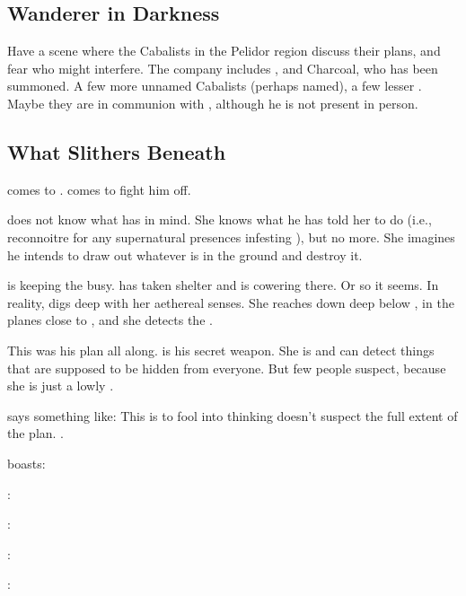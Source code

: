 \subsection{Wanderer in Darkness}
Have a scene where the Cabalists in the Pelidor region discuss their plans, and fear who might interfere. The company includes \Teshrial, \Achsah{} and Charcoal, who has been summoned. A few more unnamed Cabalists (perhaps named), a few lesser \banes{}. Maybe they are in communion with \Azraid{}, although he is not present in person. 



 






\subsection{What Slithers Beneath}
\Ishnaruchaefir comes to \Malcur. 
\Teshrial comes to fight him off. 

\Criseis does not know what \Ishnaruchaefir has in mind. 
She knows what he has told her to do (i.e., reconnoitre for any supernatural presences infesting \Malcur), but no more.
She imagines he intends to draw out whatever is in the ground and destroy it.

\Ishnaruchaefir is keeping the \resphain busy.
\Criseis has taken shelter and is cowering there.
Or so it seems. 
In reality, \Criseis digs deep with her aethereal senses.
She reaches down deep below \Malcur, in the planes close to \Nyx, and she detects the \noggyaleth.

This was his plan all along. 
\Criseis is his secret weapon. 
She is  and can detect things that are supposed to be hidden from everyone.
But few people suspect, because she is just a lowly \scatha. 

\Ishnaruchaefir{} says something like: 
This is to fool \Teshrial{} into thinking \Ishnaruchaefir{} doesn't suspect the full extent of the \noggyal{} plan. 
. 

\Teshrial boasts:
\begin{prose}
  \Teshrial:
  
  \Ishnaruchaefir: 
  
  \Teshrial:
  
  \Ishnaruchaefir:
\end{prose}

